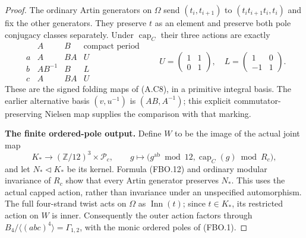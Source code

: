 \begin{proof}
The ordinary Artin generators on $\Omega$ send
$(t_i,t_{i+1})$ to $(t_it_{i+1}t_i,t_i)$ and fix the other
generators.  They preserve $t$ as an element and preserve both
pole conjugacy classes separately.  Under $\operatorname{cap}_C$
their three actions are exactly
\[
 \begin{array}{c|cc|c}
 &A&B&\text{compact period}\\ \hline
 a&A&BA&U\\
 b&AB^{-1}&B&L\\
 c&A&BA&U
 \end{array}
 \qquad
 U=\begin{pmatrix}1&1\\0&1\end{pmatrix},\quad
 L=\begin{pmatrix}1&0\\-1&1\end{pmatrix}.
                                                               \tag{FBO.12}
\]
These are the signed folding maps of (A.C8), in a primitive
integral basis.  The earlier alternative basis $(v,u^{-1})$
is $(AB,A^{-1})$; this explicit commutator-preserving Nielsen
map supplies the comparison with that marking.

\par\medskip\noindent\textbf{The finite ordered-pole output.}\quad
Define $W$ to be the image of the actual joint map
\[
 K_*\longrightarrow(\mathbb Z/12)^3\times\mathcal P_c,
 \qquad g\longmapsto
       \bigl(g^{\mathrm{ab}}\bmod12,
                       \operatorname{cap}_C(g)\bmod R_c\bigr),
                                                               \tag{FBO.13}
\]
and let $N_*\triangleleft K_*$ be its kernel.  Formula
(FBO.12) and ordinary modular invariance of $R_c$ show that
every Artin generator preserves $N_*$.  This uses the actual
capped action, rather than invariance under an unspecified
automorphism.  The full four-strand twist acts on $\Omega$
as $\operatorname{Inn}(t)$; since $t\in K_*$, its restricted
action on $W$ is inner.  Consequently the outer action factors
through $B_4/\langle(abc)^4\rangle=\Gamma_{1,2}$, with the
monic ordered poles of (FBO.1).


\end{proof}
